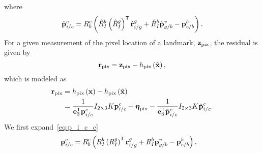 where
\begin{align}
  \hat{\boldsymbol{\mathrm{p}}}_{i/c}^c = R_b^c \left( \hat{R}_I^b \left( \hat{R}_I^g \right)^{\mathsf{T}}
  \hat{\boldsymbol{\mathrm{r}}}_{i/g}^g + \hat{R}_I^b \hat{\boldsymbol{\mathrm{p}}}_{g/b}^v - \boldsymbol{\mathrm{p}}_{c/b}^b
\right).
\end{align}
For a given measurement of the pixel location of a landmark,
$\boldsymbol{\mathrm{z}}_{\text{pix}}$, the residual is given by
\begin{equation}
  \boldsymbol{\mathrm{r}}_{\text{pix}} = \boldsymbol{\mathrm{z}}_{\text{pix}} - h_{\text{pix}} \left( \hat{\boldsymbol{\mathrm{x}}}
    \right),
\end{equation}
which is modeled as
\begin{align}
  \boldsymbol{\mathrm{r}}_{\text{pix}} &= h_{\text{pix}} \left( \boldsymbol{\mathrm{x}} \right) - h_{\text{pix}} \left( \hat{\boldsymbol{\mathrm{x}}}
    \right) \\
  &= \frac{1}{\boldsymbol{\mathrm{e}}_3^{\mathsf{T}} \boldsymbol{\mathrm{p}}_{i/c}^c} I_{2 \times 3} K
  \boldsymbol{\mathrm{p}}_{i/c}^c + \boldsymbol{\mathrm{\eta}}_{\text{pix}} - \frac{1}{\boldsymbol{\mathrm{e}}_3^{\mathsf{T}} \hat{\boldsymbol{\mathrm{p}}}_{i/c}^c} I_{2 \times 3} K
  \hat{\boldsymbol{\mathrm{p}}}_{i/c}^c.
\end{align}
We first expand~\eqref{eq:p_i_c_c}
\begin{align}
  \boldsymbol{\mathrm{p}}_{i/c}^c &= R_b^c \left( R_I^b \left( R_I^g \right)^{\mathsf{T}}
  \boldsymbol{\mathrm{r}}_{i/g}^g + R_I^b \boldsymbol{\mathrm{p}}_{g/b}^v - \boldsymbol{\mathrm{p}}_{c/b}^b \right).
\end{align}


